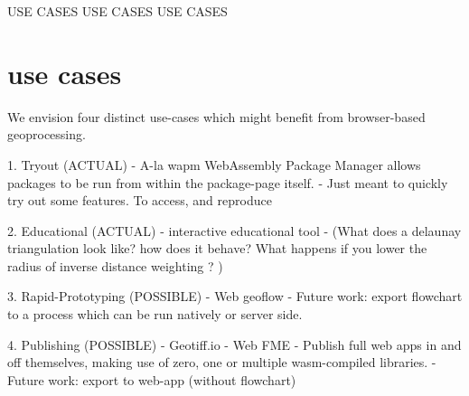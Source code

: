 






USE CASES USE CASES USE CASES


\section{use cases}
We envision four distinct use-cases which might benefit from browser-based geoprocessing. 


1. Tryout (ACTUAL)
   - A-la wapm WebAssembly Package Manager allows packages to be run from within the package-page itself. 
  - Just meant to quickly try out some features. To access, and reproduce

2. Educational (ACTUAL)
   - interactive educational tool
   - (What does a delaunay triangulation look like? how does it behave? What happens if you lower the radius of inverse distance weighting ? )

3. Rapid-Prototyping (POSSIBLE)
   - Web geoflow
   - Future work: export flowchart to a process which can be run natively or server side.

4. Publishing (POSSIBLE)
   - Geotiff.io
   - Web FME 
   - Publish full web apps in and off themselves, making use of zero, one or multiple wasm-compiled libraries.  
   - Future work: export to web-app (without flowchart)








